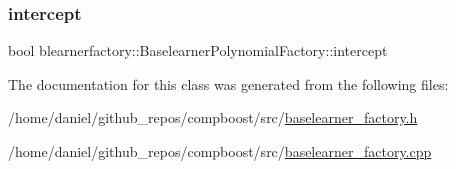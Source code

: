 \subsubsection{\texorpdfstring{intercept}{intercept}}
{\footnotesize\ttfamily bool blearnerfactory\+::\+Baselearner\+Polynomial\+Factory\+::intercept\hspace{0.3cm}{\ttfamily [private]}}



The documentation for this class was generated from the following files\+:\begin{DoxyCompactItemize}
\item 
/home/daniel/github\+\_\+repos/compboost/src/\hyperlink{baselearner__factory_8h}{baselearner\+\_\+factory.\+h}\item 
/home/daniel/github\+\_\+repos/compboost/src/\hyperlink{baselearner__factory_8cpp}{baselearner\+\_\+factory.\+cpp}\end{DoxyCompactItemize}
